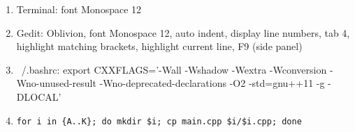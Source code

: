 \begin{enumerate}
    \item
  Terminal: font Monospace 12
  
  \item
  Gedit: Oblivion, font Monospace 12, auto indent, display line numbers, tab 4, highlight matching brackets, highlight current line, F9 (side panel)
  
  \item
  ~/.bashrc: export CXXFLAGS='-Wall -Wshadow -Wextra -Wconversion -Wno-unused-result -Wno-deprecated-declarations -O2 -std=gnu++11 -g -DLOCAL'
  \item
\begin{verbatim}
for i in {A..K}; do mkdir $i; cp main.cpp $i/$i.cpp; done
\end{verbatim}

\end{enumerate}
